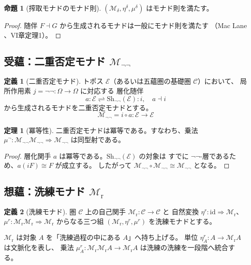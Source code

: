 \documentclass[11pt,a4paper]{ltjsarticle}
\theoremstyle{definition}
\newtheorem{definition}{定義}[section]
\newtheorem{theorem}{定理}[section]
\newtheorem{proposition}{命題}[section]
\newcommand{\id}{\mathrm{id}}
\newcommand{\Mdelta}{\mathcal{M}_{\delta}}
\newcommand{\Mneg}{\mathcal{M}_{\neg\neg}}
\newcommand{\Mr}{\mathcal{M}_{\mathrm{r}}}
\begin{document}
\begin{proposition}[搾取モナドのモナド則]
$(\Mdelta, \eta^\delta, \mu^\delta)$ はモナド則を満たす。
\end{proposition}
\begin{proof}
随伴 $F \dashv G$ から生成されるモナドは一般にモナド則を満たす
（Mac Lane \cite{MacLane1971}、VI章定理1）。
\end{proof}

\subsection{受蘊：二重否定モナド \texorpdfstring{$\Mneg$}{M-negneg}}

\begin{definition}[二重否定モナド]
トポス $\mathcal{E}$（あるいは五蘊圏の基礎圏 $\mathcal{C}$）において、
局所作用素 $j = \neg\neg : \Omega \to \Omega$ に対応する
層化随伴
\begin{equation}
a : \mathcal{E} \rightleftharpoons \mathrm{Sh}_{\neg\neg}(\mathcal{E}) : i,
\quad a \dashv i
\end{equation}
から生成されるモナドを二重否定モナドとする。
\begin{equation}
\Mneg = i \circ a : \mathcal{E} \to \mathcal{E}
\end{equation}
\end{definition}

\begin{theorem}[冪等性]
二重否定モナドは冪等である。すなわち、乗法
$\mu^\neg : \Mneg\Mneg \Rightarrow \Mneg$ は同型射である。
\end{theorem}
\begin{proof}
層化関手 $a$ は冪等である。$\mathrm{Sh}_{\neg\neg}(\mathcal{E})$ の対象は
すでに $\neg\neg$-層であるため、$a(iF) \cong F$ が成立する。
したがって $\Mneg \circ \Mneg \cong \Mneg$ となる。
\end{proof}

\subsection{想蘊：洗練モナド \texorpdfstring{$\Mr$}{M-r}}

\begin{definition}[洗練モナド]
圏 $\mathcal{C}$ 上の自己関手 $\Mr : \mathcal{C} \to \mathcal{C}$ と
自然変換 $\eta^r : \id \Rightarrow \Mr$、$\mu^r : \Mr\Mr \Rightarrow \Mr$
からなる三つ組 $(\Mr, \eta^r, \mu^r)$ を洗練モナドとする。

$\Mr$ は対象 $A$ を「洗練過程の中にある $A$」へ持ち上げる。
単位 $\eta^r_A : A \to \Mr A$ は文脈化を表し、
乗法 $\mu^r_A : \Mr\Mr A \to \Mr A$ は洗練の洗練を一段階へ統合する。
\end{definition}
\end{document}
